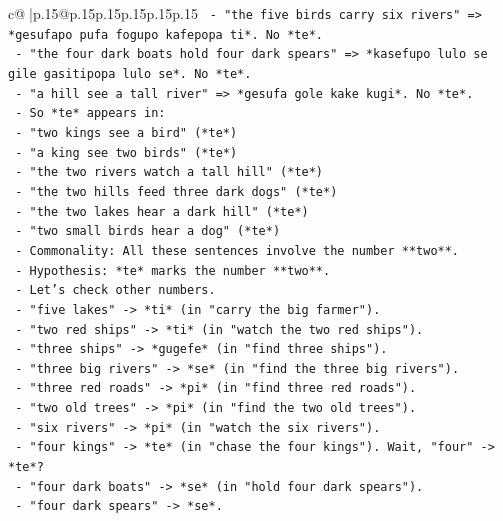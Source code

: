\documentclass{article}
\begin{document}
{\begin{supertabular}{c@{$\;$}|p{.15\linewidth}@{}p{.15\linewidth}p{.15\linewidth}p{.15\linewidth}p{.15\linewidth}p{.15\linewidth}}
{{{\texttt{          {-} "the five birds carry six rivers" => *gesufapo pufa fogupo kafepopa ti*. No *te*.} \\
\texttt{          {-} "the four dark boats hold four dark spears" => *kasefupo lulo se gile gasitipopa lulo se*. No *te*.} \\
\texttt{          {-} "a hill see a tall river" => *gesufa gole kake kugi*. No *te*.} \\
\texttt{        {-} So *te* appears in:} \\
\texttt{          {-} "two kings see a bird" (*te*)} \\
\texttt{          {-} "a king see two birds" (*te*)} \\
\texttt{          {-} "the two rivers watch a tall hill" (*te*)} \\
\texttt{          {-} "the two hills feed three dark dogs" (*te*)} \\
\texttt{          {-} "the two lakes hear a dark hill" (*te*)} \\
\texttt{          {-} "two small birds hear a dog" (*te*)} \\
\texttt{        {-} Commonality: All these sentences involve the number **two**.} \\
\texttt{        {-} Hypothesis: *te* marks the number **two**.} \\
\texttt{        {-} Let's check other numbers.} \\
\texttt{          {-} "five lakes" {-}> *ti* (in "carry the big farmer").} \\
\texttt{          {-} "two red ships" {-}> *ti* (in "watch the two red ships").} \\
\texttt{          {-} "three ships" {-}> *gugefe* (in "find three ships").} \\
\texttt{          {-} "three big rivers" {-}> *se* (in "find the three big rivers").} \\
\texttt{          {-} "three red roads" {-}> *pi* (in "find three red roads").} \\
\texttt{          {-} "two old trees" {-}> *pi* (in "find the two old trees").} \\
\texttt{          {-} "six rivers" {-}> *pi* (in "watch the six rivers").} \\
\texttt{          {-} "four kings" {-}> *te* (in "chase the four kings"). Wait, "four" {-}> *te*?} \\
\texttt{          {-} "four dark boats" {-}> *se* (in "hold four dark spears").} \\
\texttt{          {-} "four dark spears" {-}> *se*.} \\
}}}
\end{supertabular}}
\end{document}
